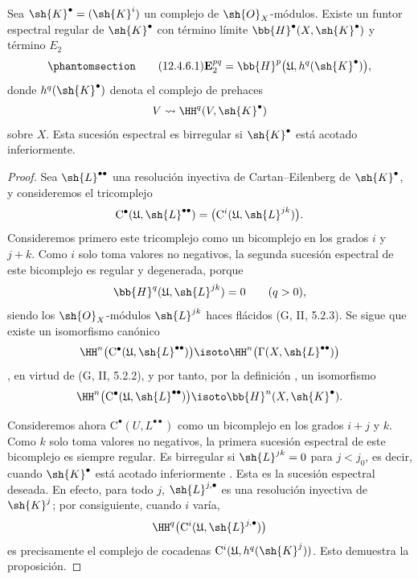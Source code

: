 \documentclass[oneside]{amsart}
\newcommand{\oldpage}[2][]{{\marginnote{\normalfont\textbf{#1}~|~#2}}\ignorespaces}
\let\EGAOriginalLabel\label
\renewcommand{\label}[1]{\phantomsection\EGAOriginalLabel{#1}}
\begin{document}
\begin{proposition}[12.4.6]
\label{0.12.4.6}
Sea $\sh{K}^\bullet=(\sh{K}^i)$ un complejo de
$\sh{O}_X$-módulos.
Existe un funtor espectral regular de $\sh{K}^\bullet$ con
término límite $\bb{H}^\bullet(X,\sh{K}^\bullet)$ y término $E_2$
\begin{equation}
\label{0.12.4.6.1}
\tag{12.4.6.1}
  \mathbf{E}_2^{pq}
  =
  \bb{H}^p\bigl(\mathfrak{U},h^q(\sh{K}^\bullet)\bigr),
\end{equation}
donde $h^q(\sh{K}^\bullet)$ denota el complejo de prehaces
\[
  V\leadsto\HH^q(V,\sh{K}^\bullet)
\]
sobre $X$.
Esta sucesión espectral es birregular si $\sh{K}^\bullet$ está acotado
inferiormente.
\end{proposition}

\begin{proof}
Sea $\sh{L}^{\bullet\bullet}$ una resolución inyectiva de
Cartan--Eilenberg de $\sh{K}^\bullet$, y consideremos el tricomplejo
\[
  \mathrm{C}^\bullet
  (\mathfrak{U},\sh{L}^{\bullet\bullet})
  =
  \bigl(\mathrm{C}^i
    (\mathfrak{U},\sh{L}^{jk})\bigr).
\]
Consideremos primero este tricomplejo como un bicomplejo en los grados $i$ y
$j+k$.
Como $i$ solo toma valores no negativos, la segunda sucesión espectral
de este bicomplejo es regular  y degenerada, porque
\[
  \bb{H}^q(\mathfrak{U},\sh{L}^{jk})=0
  \qquad(q>0),
\]
siendo los $\sh{O}_X$-módulos $\sh{L}^{jk}$ haces flácidos
\oldpage[0\textsubscript{III}]{64}
(G, II, 5.2.3).
Se sigue que existe un isomorfismo canónico
\[
  \HH^n\bigl(
    \mathrm{C}^\bullet
      (\mathfrak{U},\sh{L}^{\bullet\bullet})
  \bigr)
  \isoto
  \HH^n\bigl(\Gamma(X,\sh{L}^{\bullet\bullet})\bigr)
\]
, en virtud de (G, II, 5.2.2), y por tanto, por la
definición , un isomorfismo
\[
  \HH^n\bigl(
    \mathrm{C}^\bullet
      (\mathfrak{U},\sh{L}^{\bullet\bullet})
  \bigr)
  \isoto
  \bb{H}^n(X,\sh{K}^\bullet).
\]

Consideremos ahora
$\mathrm{C}^\bullet
(U,L^{\bullet\bullet})$
como un bicomplejo en los grados $i+j$ y $k$.
Como $k$ solo toma valores no negativos, la primera sucesión espectral
de este bicomplejo es siempre regular.
Es birregular si $\sh{L}^{jk}=0$ para $j<j_0$, es decir, cuando
$\sh{K}^\bullet$ está acotado inferiormente .
Esta es la sucesión espectral deseada.
En efecto, para todo $j$, $\sh{L}^{j,\bullet}$ es una resolución
inyectiva de $\sh{K}^j$; por consiguiente, cuando $i$ varía,
\[
  \HH^q\bigl(
    \mathrm{C}^i
      (\mathfrak{U},\sh{L}^{j,\bullet})
  \bigr)
\]
es precisamente el complejo de cocadenas
$\mathrm{C}^i(\mathfrak{U},h^q(\sh{K}^j))$.
Esto demuestra la proposición.
\end{proof}
\end{document}

